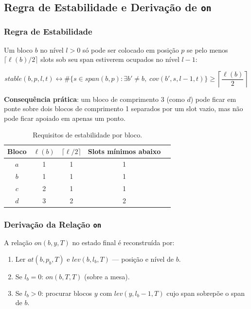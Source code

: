 \documentclass[12pt,a4paper]{article}
\begin{document}
\subsection{Regra de Estabilidade e Derivação de \texttt{on}}
\label{sec:estabilidade}

\subsubsection{Regra de Estabilidade}

Um bloco $b$ no nível $l > 0$ só pode ser colocado em posição $p$ se pelo menos $\lceil \ell(b)/2 \rceil$ slots sob seu span estiverem ocupados no nível $l-1$:

\[
stable(b,p,l,t) \leftrightarrow \#\{s \in span(b,p) : \exists b' \neq b,\; cov(b',s,l-1,t)\} \ge \left\lceil \frac{\ell(b)}{2} \right\rceil
\]

\textbf{Consequência prática}: um bloco de comprimento 3 (como $d$) pode ficar em ponte sobre dois blocos de comprimento 1 separados por um slot vazio, mas não pode ficar apoiado em apenas um ponto.

\begin{table}[h!]
\centering
\begin{tabular}{@{}ccccc@{}}
\toprule
\textbf{Bloco} & $\ell(b)$ & $\lceil \ell/2 \rceil$ & \textbf{Slots mínimos abaixo} \\
\midrule
$a$ & 1 & 1 & 1 \\
$b$ & 1 & 1 & 1 \\
$c$ & 2 & 1 & 1 \\
$d$ & 3 & 2 & 2 \\
\bottomrule
\end{tabular}
\caption{Requisitos de estabilidade por bloco.}
\end{table}

\subsubsection{Derivação da Relação \texttt{on}}

A relação $on(b,y,T)$ no estado final é reconstruída por:

\begin{enumerate}[leftmargin=1.2cm]
    \item Ler $at(b,p_b,T)$ e $lev(b,l_b,T)$ — posição e nível de $b$.
    \item Se $l_b = 0$: $on(b,T,T)$ (sobre a mesa).
    \item Se $l_b > 0$: procurar blocos $y$ com $lev(y, l_b-1, T)$ cujo span sobrepõe o span de $b$.
\end{enumerate}
\end{document}

